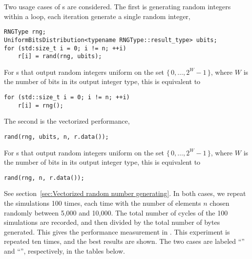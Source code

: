 Two usage cases of \rng{}s are considered. The first is generating random
integers within a loop, each iteration generate a single random integer,
\begin{verbatim}
RNGType rng;
UniformBitsDistribution<typename RNGType::result_type> ubits;
for (std:size_t i = 0; i != n; ++i)
    r[i] = rand(rng, ubits);
\end{verbatim}
For \rng{}s that output random integers uniform on the set $\{\,0,\dots,2^W -
1\,\}$, where $W$ is the number of bits in its output integer type, this is
equivalent to
\begin{verbatim}
for (std::size_t i = 0; i != n; ++i)
    r[i] = rng();
\end{verbatim}
The second is the vectorized performance,
\begin{verbatim}
rand(rng, ubits, n, r.data());
\end{verbatim}
For \rng{}s that output random integers uniform on the set $\{\,0,\dots,2^W -
1\,\}$, where $W$ is the number of bits in its output integer type, this is
equivalent to
\begin{verbatim}
rand(rng, n, r.data());
\end{verbatim}
See section~\ref{sec:Vectorized random number generating}. In both cases, we
repeat the simulations 100 times, each time with the number of elements $n$
chosen randomly between 5,000 and 10,000. The total number of cycles of the 100
simulations are recorded, and then divided by the total number of bytes
generated. This gives the performance measurement in \cpb. This experiment is
repeated ten times, and the best results are shown. The two cases are labeled
``\single'' and ``\batch'', respectively, in the tables below.







